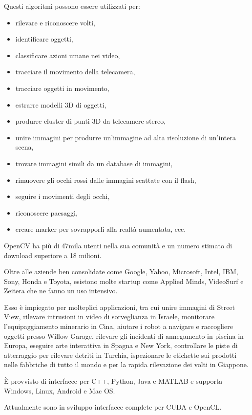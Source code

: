 Questi algoritmi possono essere utilizzati per:
\begin{itemize}
  \item rilevare e riconoscere volti, 
  \item identificare oggetti, 
  \item classificare azioni umane nei video, 
  \item tracciare il movimento della telecamera, 
  \item tracciare oggetti in movimento, 
  \item estrarre modelli 3D di oggetti, 
  \item produrre cluster di punti 3D da telecamere stereo, 
  \item unire immagini per produrre un'immagine ad alta risoluzione di un'intera scena, 
  \item trovare immagini simili da un database di immagini, 
  \item rimuovere gli occhi rossi dalle immagini scattate con il flash, 
  \item seguire i movimenti degli occhi, 
  \item riconoscere paesaggi,
  \item creare marker per sovrapporli alla realtà aumentata, ecc. 
\end{itemize}

OpenCV ha più di 47mila utenti nella sua comunità e un numero stimato di download superiore a 18 milioni.

Oltre alle aziende ben consolidate come Google, Yahoo, Microsoft, Intel, IBM, Sony, Honda e Toyota, esistono molte startup come Applied Minds, VideoSurf e Zeitera che ne fanno un uso intensivo. 

Esso è impiegato per molteplici applicazioni, tra cui unire immagini di Street View, rilevare intrusioni in video di sorveglianza in Israele, monitorare l'equipaggiamento minerario in Cina, aiutare i robot a navigare e raccogliere oggetti presso Willow Garage, rilevare gli incidenti di annegamento in piscina in Europa, eseguire arte interattiva in Spagna e New York, controllare le piste di atterraggio per rilevare detriti in Turchia, ispezionare le etichette sui prodotti nelle fabbriche di tutto il mondo e per la rapida rilevazione dei volti in Giappone.

È provvisto di interfacce per C++, Python, Java e MATLAB e supporta Windows, Linux, Android e Mac OS. 

Attualmente sono in sviluppo interfacce complete per CUDA e OpenCL. 

